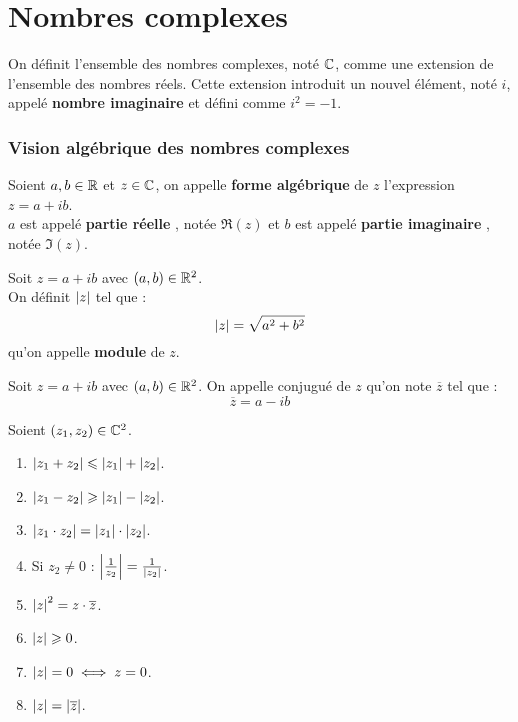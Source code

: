 \chapter{Nombres complexes}

On définit l'ensemble des nombres complexes, noté $\mathbb{C}$, comme une extension de l'ensemble des nombres réels.
Cette extension introduit un nouvel élément, noté $i$, appelé \textbf{nombre imaginaire} et défini comme $i^2=-1$.

\subsection{Vision algébrique des nombres complexes}
\begin{definition}
    Soient $a, b \in \mathbb{R}$ et $z \in \mathbb{C}$, on appelle \textbf{forme algébrique} de $z$ l'expression $z = a + ib$.
    \\
    $a$ est appelé \og \textbf{partie réelle} \fg, notée $\Re(z)$ et $b$ est appelé \og \textbf{partie imaginaire} \fg, notée $\Im(z)$.
\end{definition}

\begin{definition}
    Soit $z = a + ib$ avec $(a, b) \in \mathbb{R}^2$. 
    \\
    On définit $\abs{z}$ tel que :
    \[ \abs{z} = \sqrt{a^2 + b^2} \]
    qu'on appelle \textbf{module} de $z$.
\end{definition}

\begin{definition}
    Soit $z = a + ib$ avec $(a, b) \in \mathbb{R}^2$. On appelle conjugué de $z$ qu'on note $\overline{z}$ tel que :
    \[ \overline{z} = a - ib \]
\end{definition}

\begin{proposition}
    Soient $(z_1, z_2) \in \mathbb{C}^2$.
    \begin{enumerate}
            \item $\abs{z_1 + z_2} \leqslant \abs{z_1} + \abs{z_2}$.
            \item $\abs{z_1 - z_2} \geqslant \abs{z_1} - \abs{z_2}$.
            \item $\abs{z_1 \cdot z_2} = \abs{z_1} \cdot \abs{z_2}$.
            \item Si $z_2 \neq 0$ : $\abs{\frac{1}{z_2}} = \frac{1}{\abs{z_2}}$.
            \item $\abs{z}^2 = z \cdot \overline{z}$.
            \item $\abs{z} \geqslant 0$.
            \item $\abs{z} = 0 \iff z = 0$.
            \item $\abs{z} = \abs{\overline{z}}$.
        \end{enumerate}
\end{proposition}


